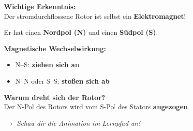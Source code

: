 \documentclass[11pt, a4paper]{article}
\newcommand{\lsg}[1]{\textcolor{loesung}{\textbf{#1}}}
\begin{document}

\begin{merkkasten}

\textbf{Wichtige Erkenntnis:}\\
Der stromdurchflossene Rotor ist selbst ein \lsg{Elektromagnet}!

Er hat einen \textbf{Nordpol (N)} und einen \textbf{Südpol (S)}.

\vspace{3mm}
\begin{minipage}{0.48\textwidth}
\textbf{Magnetische Wechselwirkung:}
\begin{itemize}[noitemsep, leftmargin=*]
    \item N--S: \lsg{ziehen sich an}
    \item N--N oder S--S: \lsg{stoßen sich ab}
\end{itemize}
\end{minipage}
\hfill
\begin{minipage}{0.48\textwidth}
\textbf{Warum dreht sich der Rotor?}\\
Der \textcolor{positiv}{N}-Pol des Rotors wird vom \textcolor{negativ}{S}-Pol des Stators \lsg{angezogen}.
\end{minipage}

\vspace{3mm}
{\small\textit{$\rightarrow$ Schau dir die Animation im Lernpfad an!}}

\end{merkkasten}

\end{document}
